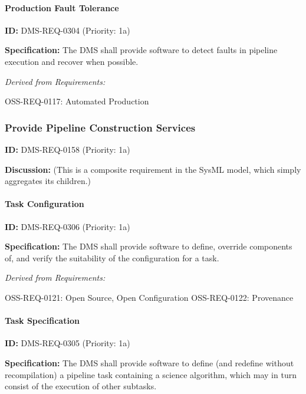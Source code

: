\documentclass[SE,toc,lsstdraft]{lsstdoc}
\begin{document}
\paragraph{Production Fault Tolerance}\hfill  %

\label{DMS-REQ-0304}
\textbf{ID:} DMS-REQ-0304 (Priority: 1a)

\textbf{Specification:} The DMS shall provide software to detect faults in pipeline execution and recover when possible.

\emph{Derived from Requirements:}

OSS-REQ-0117:
Automated Production \newline

\subsubsection{Provide Pipeline Construction Services}

\label{DMS-REQ-0158}
\textbf{ID:} DMS-REQ-0158 (Priority: 1a)

\textbf{Discussion:}
(This is a composite requirement in the SysML model, which simply aggregates its children.)

\paragraph{Task Configuration}\hfill  %

\label{DMS-REQ-0306}
\textbf{ID:} DMS-REQ-0306 (Priority: 1a)

\textbf{Specification:} The DMS shall provide software to define, override components of, and verify the suitability of the configuration for a task.

\emph{Derived from Requirements:}

OSS-REQ-0121:
Open Source, Open Configuration \newline
OSS-REQ-0122:
Provenance \newline

\paragraph{Task Specification}\hfill  %

\label{DMS-REQ-0305}
\textbf{ID:} DMS-REQ-0305 (Priority: 1a)

\textbf{Specification:} The DMS shall provide software to define (and redefine without recompilation) a pipeline task containing a science algorithm, which may in turn consist of the execution of other subtasks.
\end{document}
